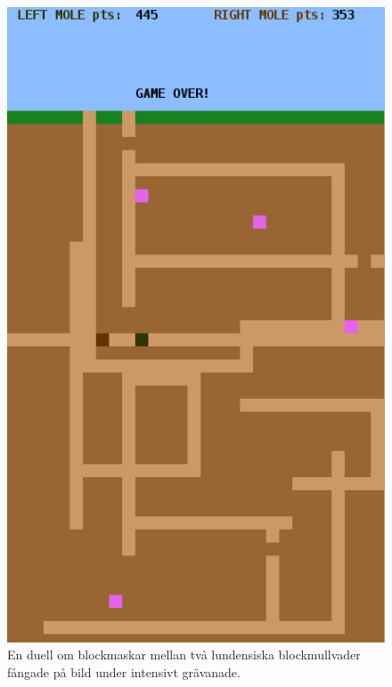 {\raggedright%
\begin{minipage}{0.45\textwidth}
\begin{figure}[H]
  \includegraphics[width=1.0\textwidth]{../img/blockbattle.png}
  \caption{En duell om blockmaskar mellan två lundensiska blockmullvader fångade på bild under intensivt grävanade.}
  \label{lab:blockbattle:fig:game}
\end{figure}
\end{minipage}%
}%
\newlength{\currentparskip}%
\newlength{\currentparindent}%
